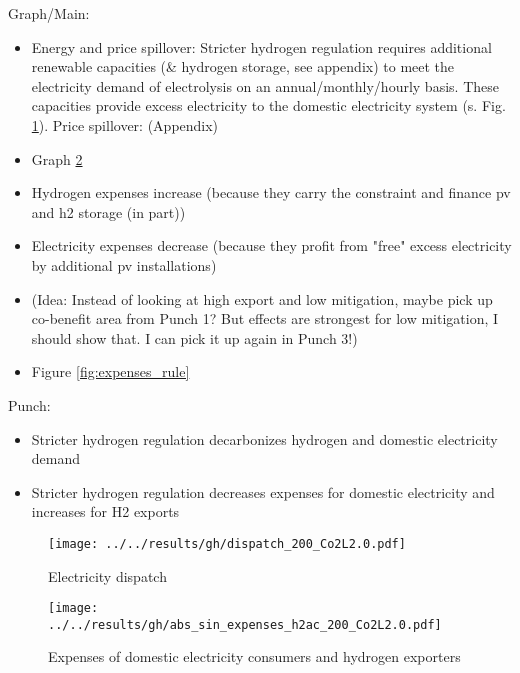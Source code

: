 Graph/Main:
\begin{itemize}
    \item Energy and price spillover: Stricter hydrogen regulation requires additional renewable capacities (\& hydrogen storage, see appendix) to meet the electricity demand of electrolysis on an annual/monthly/hourly basis. These capacities provide excess electricity to the domestic electricity system (s. Fig. \ref{fig:dispatch_rule}). Price spillover: (Appendix)
    \item Graph \ref{fig:expense_h2ac}
    \item Hydrogen expenses increase (because they carry the constraint and finance pv and h2 storage (in part)) 
    \item Electricity expenses decrease (because they profit from "free" excess electricity by additional pv installations)
    \item (Idea: Instead of looking at high export and low mitigation, maybe pick up co-benefit area from Punch 1? But effects are strongest for low mitigation, I should show that. I can pick it up again in Punch 3!)
    \item Figure \ref{fig:expenses_rule}
\end{itemize}


Punch:
\begin{itemize}
    \item Stricter hydrogen regulation decarbonizes hydrogen and domestic electricity demand
    \item Stricter hydrogen regulation decreases expenses for domestic electricity and increases for H2 exports
\end{itemize}


\begin{figure*}[h!]
    \centering
    \begin{subfigure}[b]{0.49\linewidth}
        \centering
        \texttt{[image: ../../results/gh/dispatch\_200\_Co2L2.0.pdf]}
        \caption{Electricity dispatch}
        \label{fig:dispatch_rule}
    \end{subfigure}
    \hfill
    \begin{subfigure}[b]{0.49\linewidth}
        \centering
        \texttt{[image: ../../results/gh/abs\_sin\_expenses\_h2ac\_200\_Co2L2.0.pdf]}
        \caption{Expenses of domestic electricity consumers and hydrogen exporters}
        \label{fig:expense_h2ac}
    \end{subfigure}
    \hfill
    \caption{Electricity dispatch (\ref{fig:dispatch_rule}) and expenses of consumers (\ref{fig:expense_h2ac}) for various (hydrogen) temporal matching regimes in the 200 TWh export and 0\% mitigation scenario. Stricter temporal matching decreases carbon-intensive electricity generation (coal \& gas) for hydrogen generation and even domestic electricity consumers (s. Fig. \ref{fig:dispatch_rule}). Expenses for export hydrogen generation increase to fulfill the temporal matching constraint, whereas domestic electricity consumers profit from stricter hydrogen regulation.}
    \label{fig:expenses_rule}
\end{figure*}


